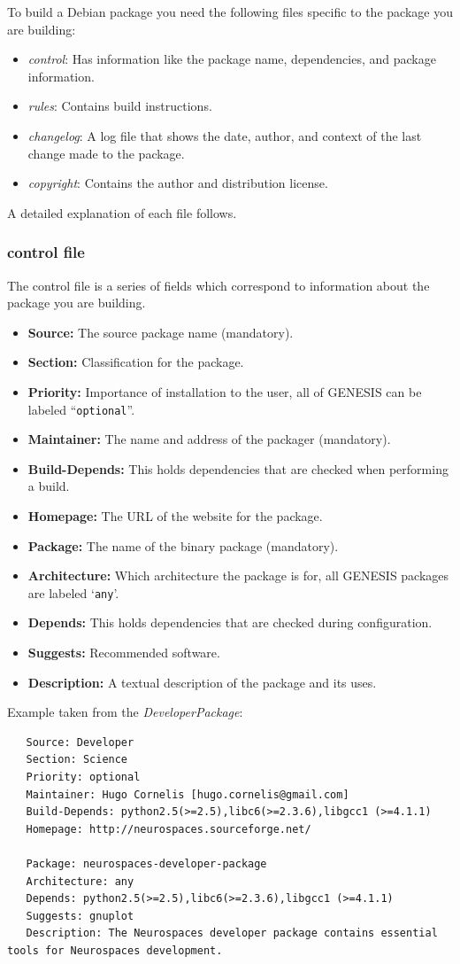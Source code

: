 \documentclass[12pt]{article}
\begin{document}
To build a Debian package you need the following files specific to the package you are building:
\begin{itemize}
\item {\it control}: Has information like the package name, dependencies, and package information.
\item {\it rules}: Contains build instructions.
\item {\it changelog}: A log file that shows the date, author, and context of the last change made to the package.
\item {\it copyright}: Contains the author and distribution license. 
\end{itemize}

A detailed explanation of each file follows.

\subsubsection*{control file}

The control file is a series of fields which correspond to information about the package you are building.
\begin{itemize}
\item {\bf Source:} The source package name ({\color{red}mandatory}).
\item {\bf Section:} Classification for the package.
\item {\bf Priority:} Importance of installation to the user, all of GENESIS can be labeled ``{\tt optional}''.
\item {\bf Maintainer:} The name and address of the packager ({\color{red}mandatory}).
\item {\bf Build-Depends:} This holds dependencies that are checked when performing a build.
\item {\bf Homepage:} The URL of the website for the package.
\item {\bf Package:} The name of the binary package ({\color{red}mandatory}).
\item {\bf Architecture:} Which architecture the package is for, all GENESIS packages are labeled `{\tt any}'.
\item {\bf Depends:} This holds dependencies that are checked during configuration.
\item {\bf Suggests:} Recommended software.
\item {\bf Description:} A textual description of the package and its uses. 
\end{itemize}
Example taken from the {\it DeveloperPackage}:
\begin{verbatim}
   Source: Developer
   Section: Science 
   Priority: optional
   Maintainer: Hugo Cornelis [hugo.cornelis@gmail.com]
   Build-Depends: python2.5(>=2.5),libc6(>=2.3.6),libgcc1 (>=4.1.1)
   Homepage: http://neurospaces.sourceforge.net/
   
   Package: neurospaces-developer-package
   Architecture: any
   Depends: python2.5(>=2.5),libc6(>=2.3.6),libgcc1 (>=4.1.1)
   Suggests: gnuplot
   Description: The Neurospaces developer package contains essential tools for Neurospaces development.
\end{verbatim}
\end{document}
